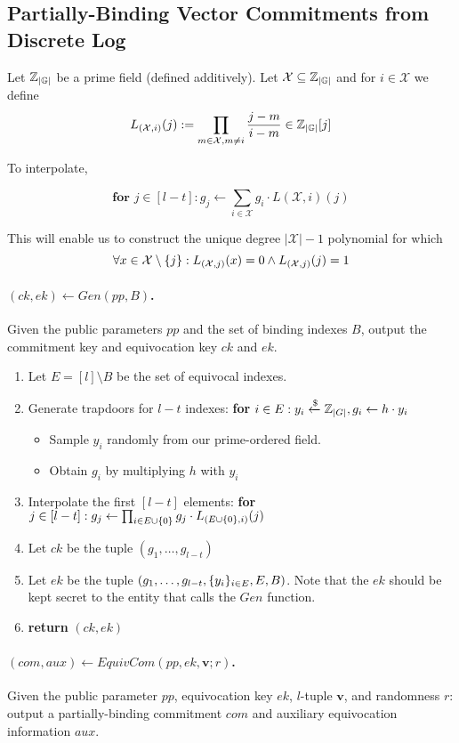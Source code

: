 \subsection{Partially-Binding Vector Commitments from Discrete Log}

\newcommand{\primefield}[0]{\Z_{|\G|}}

Let $\primefield$ be a prime field (defined additively). Let $\mathcal X \subseteq \primefield$ and for $i \in \mathcal X$ we define 
$$
L_{(\mathcal X, i)}(j) := \prod_{m \in \mathcal X, m \ne i} \frac{j - m}{i - m} \in \primefield[j]
$$

To interpolate, 

$$
\textbf{for } j \in [l-t]: g_j \leftarrow \sum_{i \in \mathcal X} g_i \cdot L(\mathcal X, i)(j)
$$

This will enable us to construct the unique degree $|\mathcal X| - 1$ polynomial for which 
$$
\forall x \in \mathcal X \setminus \{j\}: L_{(\mathcal X, j)} (x) = 0 \land L_{(\mathcal X, j)}(j) = 1
$$

\paragraph{$(ck, ek) \leftarrow Gen(pp, B)$.} Given the public parameters $pp$ and the set of binding indexes $B$, output the commitment key and equivocation key $ck$ and $ek$. 
\begin{enumerate}
    \item Let $E = [l] \setminus B$ be the set of equivocal indexes. 
    \item Generate trapdoors for $l - t$ indexes: \textbf{for} $i \in E: y_i \xleftarrow{\$} \mathbb{Z}_{|G|}, g_i \leftarrow h \cdot y_i$
    \begin{itemize}
        \item Sample $y_i$ randomly from our prime-ordered field. 
        \item Obtain $g_i$ by multiplying $h$ with $y_i$
    \end{itemize}
    \item Interpolate the first $[l-t]$ elements: \textbf{for} $j \in [l-t]: g_j \leftarrow \prod_{i\in E\cup \{0\}} g_j \cdot L_{(E\cup \{0\}, i)}(j)$
    \item Let $ck$ be the tuple $(g_1, \ldots, g_{l-t})$
    \item Let $ek$ be the tuple $(g_1, \ldots, g_{l-t}, \{y_i\}_{i \in E}, E, B)$. Note that the $ek$ should be kept secret to the entity that calls the $Gen$ function.
    \item \textbf{return} $(ck, ek)$
\end{enumerate}

\paragraph{$(com, aux) \leftarrow EquivCom(pp, ek, \mathbf{v}; r)$.} Given the public parameter $pp$, equivocation key $ek$, $l$-tuple $\mathbf{v}$, and randomness $r$: output a partially-binding commitment $com$ and auxiliary equivocation information $aux$.